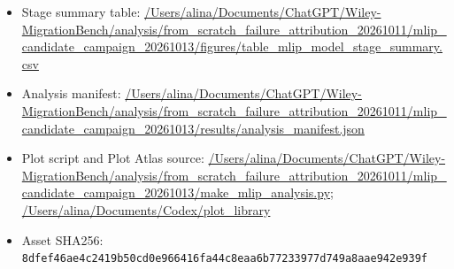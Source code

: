 \begin{itemize}[leftmargin=1.4em,noitemsep]
\item Stage summary table: \begingroup\scriptsize\url{/Users/alina/Documents/ChatGPT/Wiley-MigrationBench/analysis/from_scratch_failure_attribution_20261011/mlip_candidate_campaign_20261013/figures/table_mlip_model_stage_summary.csv}\endgroup
\item Analysis manifest: \begingroup\scriptsize\url{/Users/alina/Documents/ChatGPT/Wiley-MigrationBench/analysis/from_scratch_failure_attribution_20261011/mlip_candidate_campaign_20261013/results/analysis_manifest.json}\endgroup
\item Plot script and Plot Atlas source: \begingroup\scriptsize\url{/Users/alina/Documents/ChatGPT/Wiley-MigrationBench/analysis/from_scratch_failure_attribution_20261011/mlip_candidate_campaign_20261013/make_mlip_analysis.py}\endgroup; \url{/Users/alina/Documents/Codex/plot_library}
\item Asset SHA256: \texttt{8dfef46ae4c2419b50cd0e966416fa44c8eaa6b77233977d749a8aae942e939f}
\end{itemize}
